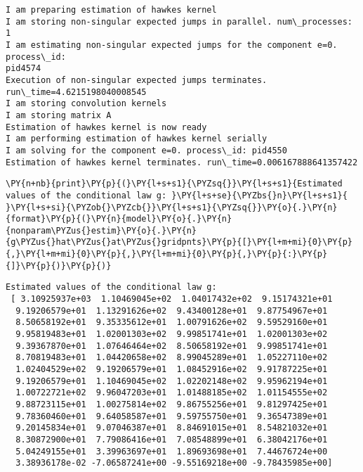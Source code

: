 \documentclass[10pt, article,table]{article}
\begin{document}
    \begin{Verbatim}[commandchars=\\\{\}]
I am preparing estimation of hawkes kernel
I am storing non-singular expected jumps in parallel. num\_processes: 1
I am estimating non-singular expected jumps for the component e=0. process\_id:
pid4574
Execution of non-singular expected jumps terminates. run\_time=4.6215198040008545
I am storing convolution kernels
I am storing matrix A
Estimation of hawkes kernel is now ready
I am performing estimation of hawkes kernel serially
I am solving for the component e=0. process\_id: pid4550
Estimation of hawkes kernel terminates. run\_time=0.006167888641357422
    \end{Verbatim}

    \begin{tcolorbox}[breakable, size=fbox, boxrule=1pt, pad at break*=1mm,colback=cellbackground, colframe=cellborder]
\begin{Verbatim}[commandchars=\\\{\}]
\PY{n+nb}{print}\PY{p}{(}\PY{l+s+s1}{\PYZsq{}}\PY{l+s+s1}{Estimated values of the conditional law g: }\PY{l+s+se}{\PYZbs{}n}\PY{l+s+s1}{ }\PY{l+s+si}{\PYZob{}\PYZcb{}}\PY{l+s+s1}{\PYZsq{}}\PY{o}{.}\PY{n}{format}\PY{p}{(}\PY{n}{model}\PY{o}{.}\PY{n}{nonparam\PYZus{}estim}\PY{o}{.}\PY{n}{g\PYZus{}hat\PYZus{}at\PYZus{}gridpnts}\PY{p}{[}\PY{l+m+mi}{0}\PY{p}{,}\PY{l+m+mi}{0}\PY{p}{,}\PY{l+m+mi}{0}\PY{p}{,}\PY{p}{:}\PY{p}{]}\PY{p}{)}\PY{p}{)}
\end{Verbatim}
\end{tcolorbox}

    \begin{Verbatim}[commandchars=\\\{\}]
Estimated values of the conditional law g:
 [ 3.10925937e+03  1.10469045e+02  1.04017432e+02  9.15174321e+01
  9.19206579e+01  1.13291626e+02  9.43400128e+01  9.87754967e+01
  8.50658192e+01  9.35335612e+01  1.00791626e+02  9.59529160e+01
  9.95819483e+01  1.02001303e+02  9.99851741e+01  1.02001303e+02
  9.39367870e+01  1.07646464e+02  8.50658192e+01  9.99851741e+01
  8.70819483e+01  1.04420658e+02  8.99045289e+01  1.05227110e+02
  1.02404529e+02  9.19206579e+01  1.08452916e+02  9.91787225e+01
  9.19206579e+01  1.10469045e+02  1.02202148e+02  9.95962194e+01
  1.00722721e+02  9.96047203e+01  1.01488185e+02  1.01154555e+02
  9.88723115e+01  1.00275814e+02  9.86755256e+01  9.81297425e+01
  9.78360460e+01  9.64058587e+01  9.59755750e+01  9.36547389e+01
  9.20145834e+01  9.07046387e+01  8.84691015e+01  8.54821032e+01
  8.30872900e+01  7.79086416e+01  7.08548899e+01  6.38042176e+01
  5.04249155e+01  3.39963697e+01  1.89693698e+01  7.44676724e+00
  3.38936178e-02 -7.06587241e+00 -9.55169218e+00 -9.78435985e+00]
    \end{Verbatim}
\end{document}
